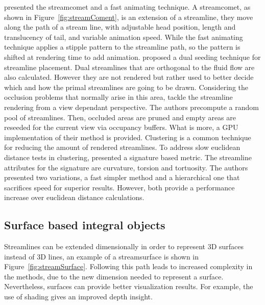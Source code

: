 \cite{Laramee2005} presented the streamcomet and a fast animating technique.
A streamcomet, as shown in Figure~\ref{fig:streamComent}, is an extension of a streamline, they move along the path of a stream line, with adjustable head position, length and translucency of tail, and variable animation speed.
While the fast animating technique applies a stipple pattern to the streamline path, so the pattern is shifted at rendering time to add animation.
\cite{Rosanwo2009} proposed a dual seeding technique for streamline placement.
Dual streamlines that are orthogonal to the fluid flow are also calculated.
However they are not rendered but rather used to better decide which and how the primal streamlines are going to be drawn.
Considering the occlusion problems that normally arise in this area, \cite{Marchesin2010} tackle the streamline rendering from a view dependant perspective.
The authors precompute a random pool of streamlines.
Then, occluded areas are pruned and empty areas are reseeded for the current view via occupancy buffers.
What is more, a GPU implementation of their method is provided.
Clustering is a common technique for reducing the amount of rendered streamlines.
To address slow euclidean distance tests in clustering, \cite{McLoughlin2013} presented a signature based metric.
The streamline attributes for the signature are curvature, torsion and tortuosity.
The authors presented two variations, a fast simpler method and a hierarchical one that sacrifices speed for superior results.
However, both provide a performance increase over euclidean distance calculations.

\subsection{Surface based integral objects}

Streamlines can be extended dimensionally in order to represent 3D surfaces instead of 3D lines, an example of a streamsurface is shown in Figure~\ref{fig:streamSurface}.
Following this path leads to increased complexity in the methods, due to the new dimension needed to represent a surface.
Nevertheless, surfaces can provide better visualization results.
For example, the use of shading gives an improved depth insight.

